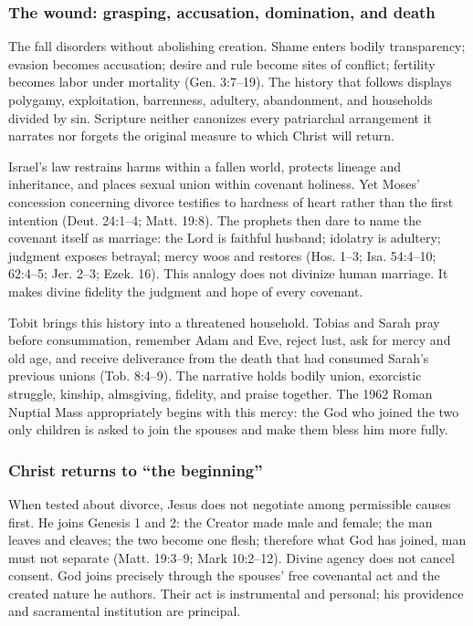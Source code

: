 \subsubsection{The wound: grasping, accusation, domination, and death}

The fall disorders without abolishing creation. Shame enters bodily transparency; evasion becomes accusation; desire and rule become sites of conflict; fertility becomes labor under mortality (Gen. 3:7--19). The history that follows displays polygamy, exploitation, barrenness, adultery, abandonment, and households divided by sin. Scripture neither canonizes every patriarchal arrangement it narrates nor forgets the original measure to which Christ will return.

\enlargethispage{\baselineskip}
Israel's law restrains harms within a fallen world, protects lineage and inheritance, and places sexual union within covenant holiness. Yet Moses' concession concerning divorce testifies to hardness of heart rather than the first intention (Deut. 24:1--4; Matt. 19:8). The prophets then dare to name the covenant itself as marriage: the Lord is faithful husband; idolatry is adultery; judgment exposes betrayal; mercy woos and restores (Hos. 1--3; Isa. 54:4--10; 62:4--5; Jer. 2--3; Ezek. 16). This analogy does not divinize human marriage. It makes divine fidelity the judgment and hope of every covenant.

Tobit brings this history into a threatened household. Tobias and Sarah pray before consummation, remember Adam and Eve, reject lust, ask for mercy and old age, and receive deliverance from the death that had consumed Sarah's previous unions (Tob. 8:4--9). The narrative holds bodily union, exorcistic struggle, kinship, almsgiving, fidelity, and praise together. The 1962 Roman Nuptial Mass appropriately begins with this mercy: the God who joined the two only children is asked to join the spouses and make them bless him more fully.

\subsubsection{Christ returns to ``the beginning''}

When tested about divorce, Jesus does not negotiate among permissible causes first. He joins Genesis 1 and 2: the Creator made male and female; the man leaves and cleaves; the two become one flesh; therefore what God has joined, man must not separate (Matt. 19:3--9; Mark 10:2--12). Divine agency does not cancel consent. God joins precisely through the spouses' free covenantal act and the created nature he authors. Their act is instrumental and personal; his providence and sacramental institution are principal.

